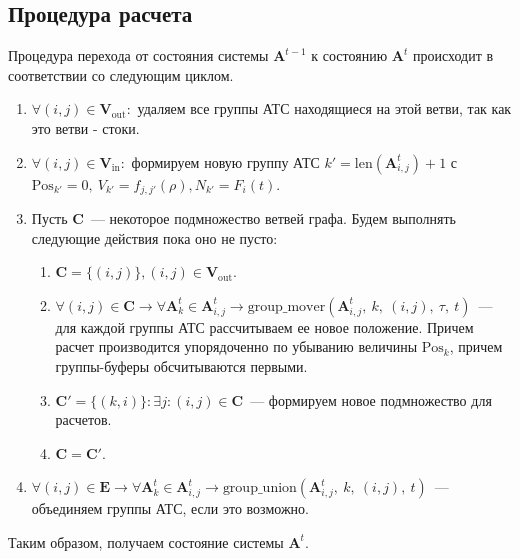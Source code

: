 \subsection{Процедура расчета}
Процедура перехода от состояния системы \(\mathbf{A}^{t-1}\) к состоянию \(\mathbf{A}^t\) происходит в соответствии со следующим циклом.
\begin{enumerate}
  \item \(\forall (i, j) \in \mathbf{V}_\text{out}:\) удаляем все группы АТС находящиеся на этой ветви, так как это ветви - стоки.
  \item \(\forall (i, j) \in \mathbf{V}_\text{in}:\) формируем новую группу АТС \(k' = \text{len}(\mathbf{A}^t_{i,j}) + 1\) с \(\mathrm{Pos}_{k'}  = 0,\ V_{k'}  = f_{j,j'}(\rho), N_{k'} = F_i(t)\).
  \item Пусть \(\mathbf{C}\)~--- некоторое подмножество ветвей графа. Будем выполнять следующие действия пока оно не пусто:
  \begin{enumerate}
      \item \(\mathbf{C} = \{(i, j)\}, (i, j) \in \mathbf{V}_\text{out}\).
      \item \(\forall (i, j) \in \mathbf{C} \rightarrow \forall \mathbf{A}^t_k \in \mathbf{A}^t_{i,j} \rightarrow \text{group\_mover}(\mathbf{A}^t_{i,j},\ k,\ (i,j),\ \tau,\ t)\)~--- для каждой группы АТС рассчитываем ее новое положение. Причем расчет производится упорядоченно по убыванию величины \(\mathrm{Pos}_{k}\), причем группы-буферы обсчитываются первыми.
      \item \(\mathbf{C'} = \{(k, i)\}: \exists j: (i, j) \in \mathbf{C}\)~--- формируем новое подмножество для расчетов.
      \item \(\mathbf{C} = \mathbf{C'}\).
  \end{enumerate}
  \item \(\forall (i, j) \in \mathbf{E} \rightarrow \forall \mathbf{A}^t_k \in \mathbf{A}^t_{i,j} \rightarrow \text{group\_union}(\mathbf{A}^t_{i,j},\ k,\ (i,j),\ t)\)~--- объединяем группы АТС, если это возможно.
\end{enumerate}

Таким образом, получаем состояние системы \(\mathbf{A}^t\).

\FloatBarrier
